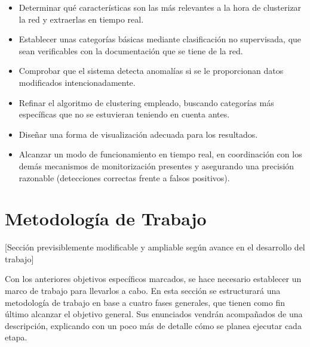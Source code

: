 \begin{itemize}

\item Determinar qué características son las más relevantes a la hora de clusterizar la red y extraerlas en tiempo real.

\item Establecer unas categorías básicas mediante clasificación no supervisada, que sean verificables con la documentación que se tiene de la red.

\item Comprobar que el sistema detecta anomalías si se le proporcionan datos modificados intencionadamente.

\item Refinar el algoritmo de clustering empleado, buscando categorías más específicas que no se estuvieran teniendo en cuenta antes.

\item Diseñar una forma de visualización adecuada para los resultados.

\item Alcanzar un modo de funcionamiento en tiempo real, en coordinación con los demás mecanismos de monitorización presentes y asegurando una precisión razonable (detecciones correctas frente a falsos positivos).

\end{itemize}

\section{Metodología de Trabajo}\label{sec:metodología}

[Sección previsiblemente modificable y ampliable según avance en el desarrollo del trabajo]

Con los anteriores objetivos específicos marcados, se hace necesario establecer un marco de trabajo para llevarlos a cabo.
En esta sección se estructurará una metodología de trabajo en base a cuatro fases generales, que tienen como fin último alcanzar el objetivo general.
Sus enunciados vendrán acompañados de una descripción, explicando con un poco más de detalle cómo se planea ejecutar cada etapa.

